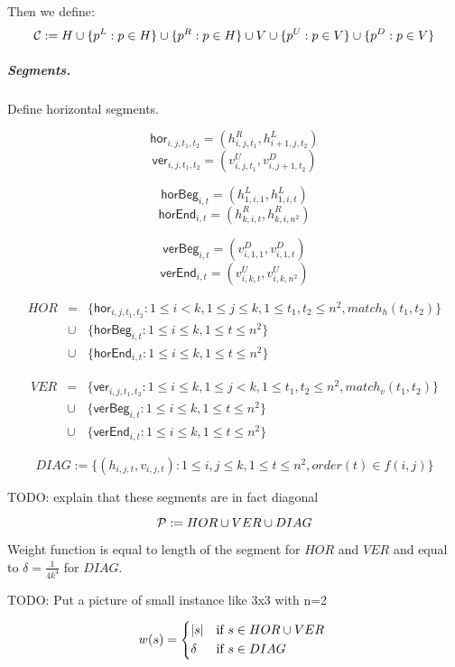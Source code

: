 Then we define:
$$\mathcal{C} := H \cup \{p^L : p \in H\} \cup \{p^R : p \in H\}
\cup V \cup \{p^U : p \in V\} \cup \{p^D : p \in V\} $$


\subparagraph{Segments.}
Define horizontal segments.

\newcommand{\hor}[4]{\mathsf{hor}_{#1,#2,#3,#4}}
\newcommand{\ver}[4]{\mathsf{ver}_{#1,#2,#3,#4}}
\newcommand{\horbeg}[2]{\mathsf{horBeg}_{#1,#2}}
\newcommand{\verbeg}[2]{\mathsf{verBeg}_{#1,#2}}
\newcommand{\horend}[2]{\mathsf{horEnd}_{#1,#2}}
\newcommand{\verend}[2]{\mathsf{verEnd}_{#1,#2}}

$$\hor{i}{j}{t_1}{t_2} = (h^R_{i,j,t_1}, h^L_{i+1, j, t_2})$$
$$\ver{i}{j}{t_1}{t_2} = (v^U_{i,j,t_1}, v^D_{i, j+1, t_2})$$

$$\horbeg{i}{t} = (h^L_{1, i, 1}, h^L_{1, i, t})$$
$$\horend{i}{t} = (h^R_{k, i, t}, h^R_{k, i, n^2})$$

$$\verbeg{i}{t} = (v^D_{i, 1, 1}, v^D_{i, 1, t})$$
$$\verend{i}{t} = (v^U_{i, k, t}, v^U_{i, k, n^2})$$

\begin{eqnarray*}
HOR &= &\{\hor{i}{j}{t_1}{t_2} : 1 \le i < k, 1 \le j \le k,
1 \le t_1, t_2 \le n^2, match_h(t_1, t_2)\} \\
&\cup &\{\horbeg{i}{t} : 1 \le i \le k, 1 \le t \le n^2\}
\\
&\cup &\{\horend{i}{t} : 1 \le i \le k, 1 \le t \le n^2\}
\end{eqnarray*}

\begin{eqnarray*}
VER &= &\{\ver{i}{j}{t_1}{t_2} : 1 \le i \le k, 1 \le j < k,
1 \le t_1, t_2 \le n^2, match_v(t_1, t_2)\} \\
&\cup &\{\verbeg{i}{t} : 1 \le i \le k, 1 \le t \le n^2\}
\\
&\cup &\{\verend{i}{t} : 1 \le i \le k, 1 \le t \le n^2\}
\end{eqnarray*}

$$DIAG := \{ (h_{i, j, t}, v_{i, j, t}) :
	1 \le i, j \le k, 1 \le t \le n^2, order(t) \in f(i, j)\}$$

TODO: explain that these segments are in fact diagonal

$$\mathcal{P} := HOR \cup VER \cup DIAG$$

Weight function is equal to length of the segment for $HOR$ and $VER$
and equal to $\delta = \frac{1}{4k^4}$ for $DIAG$.

TODO: Put a picture of small instance like 3x3 with n=2

\begin{equation}
w(s) =
	\begin{cases*}
	  |s| 			& if $s \in HOR \cup VER$ \\
	  \delta        & if $s \in DIAG$
	\end{cases*}
\end{equation}

